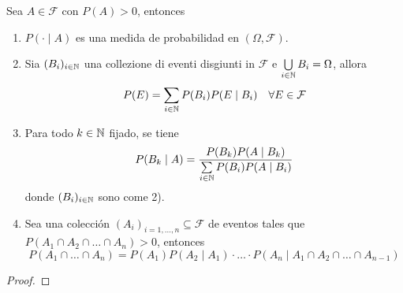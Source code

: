 \begin{teo}
    Sea $A\in \mathcal{F}$ con $P(A)>0$, entonces 
    \begin{enumerate}[label=\arabic*)]
        \item $P(\cdot \mid A)$ es una medida de probabilidad en $(\Omega, \mathcal{F})$.
        \item Sia $(B_i)_{i\in \mathbb{N}}$ una collezione di eventi disgiunti in $\mathcal{F}$ e $\bigcup\limits_{i\in \mathbb{N}} B_i = \Omega$, allora 
        \begin{equation*}
            P(E)=\sum_{i\in \mathbb{N}} P(B_i) P(E \mid B_i) \quad \forall E\in \mathcal{F}
        \end{equation*}
        \item {} Para todo $k\in \mathbb{N}$ fijado, se tiene
        \begin{equation*}
            P(B_k \mid A) = \dfrac{P(B_k) P(A \mid B_k)}{\sum\limits_{i\in \mathbb{N}} P(B_i) P(A \mid B_i)} 
        \end{equation*}
        donde $(B_i)_{i\in \mathbb{N}}$ sono come 2).
        \item Sea una colección $(A_i)_{i=1, \dots, n}\subseteq \mathcal{F}$ de eventos tales que $P(A_1 \cap A_2 \cap \ldots \cap A_n) > 0$, entonces
        \begin{equation*}
            P(A_1 \cap \ldots \cap A_n) = P(A_1) P(A_2 \mid A_1) \cdot \ldots \cdot P(A_n \mid A_1 \cap A_2 \cap \ldots \cap A_{n-1})
        \end{equation*}
    \end{enumerate}
    \begin{proof}
    \end{proof}
\end{teo}

